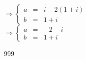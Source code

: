 \documentclass[a4paper]{article}
\begin{document}
$\Rightarrow\left\{
	\begin{array}{lll} 
	    a &=& i-2(1+i) \\
		b &=& 1+i
	\end{array}
\right .$\\

$\Rightarrow\left\{
	\begin{array}{lll} 
	    a &=& -2-i \\
		b &=& 1+i
	\end{array}
\right .$\\














\begin{thebibliography}{999}
\end{thebibliography}
\end{document}
